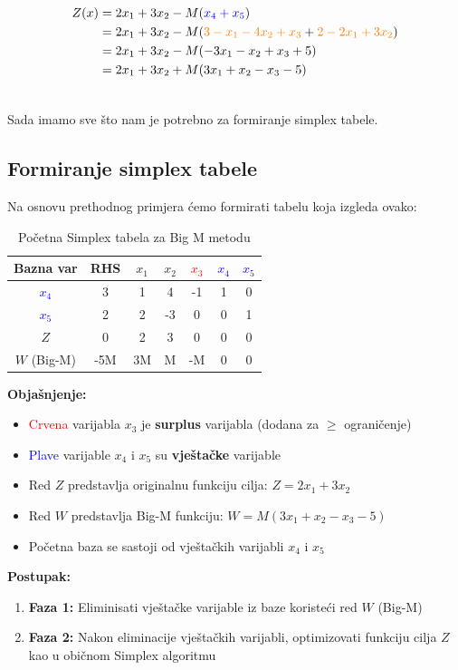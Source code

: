 \documentclass[12pt,a4paper]{article}
\begin{document}
\begin{equation}
\begin{aligned}
    Z(x)&=2x_1+3x_2-M(\textcolor{blue}{x_4+x_5})\\&=2x_1+3x_2-M(\textcolor{orange}{3-x_1-4x_2+x_3}+\textcolor{orange}{2-2x_1+3x_2})\\&=
    2x_1+3x_2-M(-3x_1-x_2+x_3+5)\\&=
    2x_1+3x_2+M(3x_1+x_2-x_3-5)\\&
\end{aligned}
\end{equation}

Sada imamo sve što nam je potrebno za formiranje simplex tabele.

\subsection{Formiranje simplex tabele}

Na osnovu prethodnog primjera ćemo formirati tabelu koja izgleda ovako:

\begin{table}[h]
\centering
\begin{tabular}{|c|c|c|c|c|c|c|}
\hline
Bazna var & RHS & $x_1$ & $x_2$ & \textcolor{red}{$x_3$} & \textcolor{blue}{$x_4$} & \textcolor{blue}{$x_5$} \\
\hline
\textcolor{blue}{$x_4$} & 3 & 1 & 4 & -1 & 1 & 0 \\
\hline
\textcolor{blue}{$x_5$} & 2 & 2 & -3 & 0 & 0 & 1 \\
\hline
$Z$ & 0 & 2 & 3 & 0 & 0 & 0 \\
\hline
$W$ (Big-M) & -5M & 3M & M & -M & 0 & 0 \\
\hline
\end{tabular}
\caption{Početna Simplex tabela za Big M metodu}
\end{table}

\textbf{Objašnjenje:}
\begin{itemize}
    \item \textcolor{red}{Crvena} varijabla $x_3$ je \textbf{surplus} varijabla (dodana za $\geq$ ograničenje)
    \item \textcolor{blue}{Plave} varijable $x_4$ i $x_5$ su \textbf{vještačke} varijable
    \item Red $Z$ predstavlja originalnu funkciju cilja: $Z = 2x_1 + 3x_2$
    \item Red $W$ predstavlja Big-M funkciju: $W = M(3x_1 + x_2 - x_3 - 5)$
    \item Početna baza se sastoji od vještačkih varijabli $x_4$ i $x_5$
\end{itemize}

\textbf{Postupak:}
\begin{enumerate}
    \item \textbf{Faza 1:} Eliminisati vještačke varijable iz baze koristeći red $W$ (Big-M)
    \item \textbf{Faza 2:} Nakon eliminacije vještačkih varijabli, optimizovati funkciju cilja $Z$ kao u običnom Simplex algoritmu
\end{enumerate}
\end{document}
